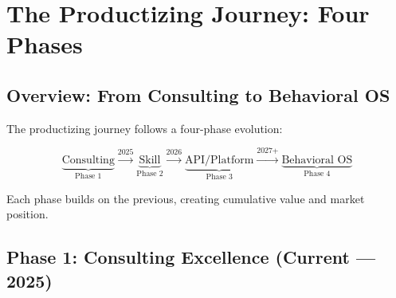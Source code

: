\section{The Productizing Journey: Four Phases}
\label{sec:vvv4-journey}

\subsection{Overview: From Consulting to Behavioral OS}

The productizing journey follows a four-phase evolution:

\begin{equation}
\underbrace{\text{Consulting}}_{\text{Phase 1}} \xrightarrow{\text{2025}}
\underbrace{\text{Skill}}_{\text{Phase 2}} \xrightarrow{\text{2026}}
\underbrace{\text{API/Platform}}_{\text{Phase 3}} \xrightarrow{\text{2027+}}
\underbrace{\text{Behavioral OS}}_{\text{Phase 4}}
\end{equation}

Each phase builds on the previous, creating cumulative value and market position.


\subsection{Phase 1: Consulting Excellence (Current --- 2025)}

